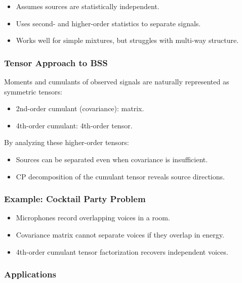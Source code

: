 \documentclass[
  letterpaper,
  DIV=11,
  numbers=noendperiod]{scrreprt}
\providecommand{\tightlist}{%
  \setlength{\itemsep}{0pt}\setlength{\parskip}{0pt}}
\begin{document}
\begin{itemize}
\tightlist
\item
  Assumes sources are statistically independent.
\item
  Uses second- and higher-order statistics to separate signals.
\item
  Works well for simple mixtures, but struggles with multi-way
  structure.
\end{itemize}

\subsubsection{Tensor Approach to BSS}\label{tensor-approach-to-bss}

Moments and cumulants of observed signals are naturally represented as
symmetric tensors:

\begin{itemize}
\tightlist
\item
  2nd-order cumulant (covariance): matrix.
\item
  4th-order cumulant: 4th-order tensor.
\end{itemize}

By analyzing these higher-order tensors:

\begin{itemize}
\tightlist
\item
  Sources can be separated even when covariance is insufficient.
\item
  CP decomposition of the cumulant tensor reveals source directions.
\end{itemize}

\subsubsection{Example: Cocktail Party
Problem}\label{example-cocktail-party-problem}

\begin{itemize}
\tightlist
\item
  Microphones record overlapping voices in a room.
\item
  Covariance matrix cannot separate voices if they overlap in energy.
\item
  4th-order cumulant tensor factorization recovers independent voices.
\end{itemize}

\subsubsection{Applications}\label{applications-7}
\end{document}
